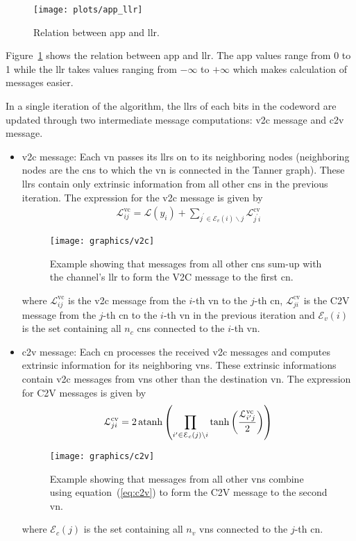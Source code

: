 \begin{figure}[htbp]
  \centering
  \texttt{[image: plots/app\_llr]}
  \caption{Relation between \ac{app} and \ac{llr}.}
  \label{fig:app_llr}
\end{figure}

Figure~\ref{fig:app_llr} shows the relation between \ac{app} and \ac{llr}. The \ac{app} values range from 0 to 1 while the \ac{llr} takes values ranging from $-\infty$ to $+\infty$ which makes calculation of messages easier.

In a single iteration of the algorithm, the \acp{llr} of each bits in the codeword are updated through two intermediate message computations: \ac{v2c} message and \ac{c2v} message.
\begin{itemize}
  \item \ac{v2c} message: Each \ac{vn} passes its \acp{llr} on to its neighboring nodes (neighboring nodes are the \acp{cn} to which the \ac{vn} is connected in the Tanner graph). These \acp{llr} contain only extrinsic information from all other \acp{cn} in the previous iteration. The expression for the \ac{v2c} message is given by~\cite{Hagenauer1996}
  \begin{align}
    \mathcal{L}^{\mathrm{vc}}_{ij}=\mathcal{L}(y_i)+\sum_{j^\prime\in\mathcal{E}_v(i)\backslash j} \mathcal{L}^{\mathrm{cv}}_{j^\prime i}
  \end{align}
  \begin{figure}[htbp]
    \centering
    \texttt{[image: graphics/v2c]}
    \caption{Example showing that messages from all other \acp{cn} sum-up with the channel's \ac{llr} to form the V2C message to the first \ac{cn}.}
    \label{fig:v2c}
  \end{figure}
  where $\mathcal{L}^{\mathrm{vc}}_{ij}$ is the \ac{v2c} message from the $i$-th \ac{vn} to the $j$-th \ac{cn}, $\mathcal{L}^{\mathrm{cv}}_{ji}$ is the C2V message from the $j$-th \ac{cn} to the $i$-th \ac{vn} in the previous iteration and $\mathcal{E}_v(i)$ is the set containing  all $n_c$ \acp{cn} connected to the $i$-th \ac{vn}.
  \item \ac{c2v} message: Each \ac{cn} processes the received \ac{v2c} messages and computes extrinsic information for its neighboring \acp{vn}. These extrinsic informations contain \ac{v2c} messages from \acp{vn} other than the destination \ac{vn}. The expression for C2V messages is given by~\cite{Hagenauer1996}
  \begin{align}\label{eq:c2v}
  \mathcal{L}^{\mathrm{cv}}_{ji}=2\operatorname{atanh}\left(\prod_{i^\prime\in\mathcal{E}_c(j)\backslash i}\tanh\left(\frac{\mathcal{L}^{\mathrm{vc}}_{i^\prime j}}{2}\right)\right)
  \end{align}
  \begin{figure}[htbp]
    \centering
    \texttt{[image: graphics/c2v]}
    \caption{Example showing that messages from all other \acp{vn} combine using equation~(\ref{eq:c2v}) to form the C2V message to the second \ac{vn}.}
    \label{fig:c2v}
  \end{figure}
  where $\mathcal{E}_c(j)$ is the set containing all $n_v$ \acp{vn} connected to the $j$-th \ac{cn}.
\end{itemize}
